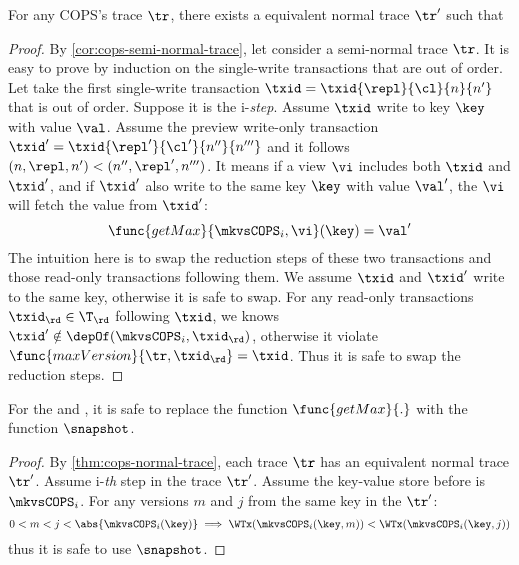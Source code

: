 \begin{theorem}
    \label{thm:cops-normal-trace}
    \label{lem:cops-normal-trace}
    \label{cor:cops-normal-trace}
    For any COPS's trace \( \tr \), there exists a equivalent normal trace \( \tr' \) such that
\end{theorem}
\begin{proof}
    By \cref{cor:cops-semi-normal-trace}, let consider a semi-normal trace \( \tr \).
    It is easy to prove by induction on the single-write transactions that are out of order.
    Let take the first single-write transaction \( \txid = \txid{\repl}{\cl}{n}{n'} \) that is out of order.
    Suppose it is the i-\emph{step}.
    Assume \( \txid \) write to key \( \key \) with value \( \val \).
    Assume the preview write-only transaction \( \txid'  = \txid{\repl'}{\cl'}{n''}{n'''} \) and it follows \( (n,\repl,n') < (n'', \repl', n''') \).
    It means if a view \( \vi \) includes both \( \txid \)  and \( \txid' \), and if \( \txid' \) also write to the same key \( \key \) with value \( \val' \), the \( \vi \) will fetch the value from \( \txid' \):
    \begin{equation}
        \label{equ:out-order-wrte-older-value}
        \func{getMax}{\mkvsCOPS_i,\vi}(\key) = \val'
    \end{equation}
    The intuition here is to swap the reduction steps of these two transactions and those read-only transactions following them.
    We assume \( \txid \)  and \( \txid' \) write to the same key, otherwise it is safe to swap.
    For any read-only transactions \( \txid_{\rd} \in \T_{\rd} \) following \( \txid \), we knows \( \txid' \notin \depOf(\mkvsCOPS_i, \txid_{\rd}) \), otherwise it violate \( \func{maxVersion}{\tr, \txid_\rd} = \txid \).
    Thus it is safe to swap the reduction steps.
\end{proof}


\begin{corollary}
    \label{cor:get-max-to-get-snap}
    For the  and , it is safe to replace the function \( \func{getMax}{.} \) with the function \( \snapshot \).
\end{corollary}
\begin{proof}
    By \cref{thm:cops-normal-trace}, each trace \( \tr \) has an equivalent normal trace \( \tr' \).
    Assume i-\emph{th} step in the trace \( \tr' \).
    Assume the key-value store before is \( \mkvsCOPS_i \).
    For any versions \( m \) and \( j \) from the same key in the \( \tr' \):
    \[
        0 < m < j < \abs{\mkvsCOPS_i(\key)} \implies \WTx(\mkvsCOPS_i(\key,m)) <  \WTx(\mkvsCOPS_i(\key,j))
    \]
    thus it is safe to use \( \snapshot \).
\end{proof}

